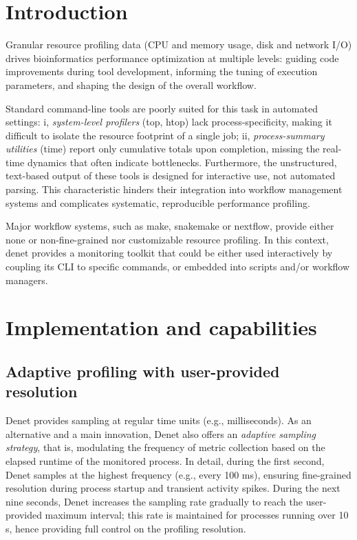 \documentclass[10pt]{article}
\renewcommand{\label}[1]{\gdef\labelname{##1}}%
\begin{document}
\section*{Introduction}  %
\label{sec:intro}

Granular resource profiling data (CPU and memory usage, disk and network I/O)  drives bioinformatics performance optimization at multiple levels: guiding code improvements during tool development, informing the tuning of execution parameters, and shaping the design of the overall workflow.

Standard command-line tools are poorly suited for this task in automated settings: i, \emph{system-level profilers} (top, htop) lack process-specificity, making it difficult to isolate the resource footprint of a single job; ii, \emph{process-summary utilities} (time) report only cumulative totals upon completion, missing the real-time dynamics that often indicate bottlenecks. Furthermore, the unstructured, text-based output of these tools is designed for interactive use, not automated parsing. This characteristic hinders their integration into workflow management systems and complicates systematic, reproducible performance profiling.

Major workflow systems, such as make, snakemake or nextflow, provide either none or non-fine-grained nor customizable resource profiling. In this context, denet provides a monitoring toolkit that could be either used interactively by coupling its CLI to specific commands, or embedded into scripts and/or workflow managers.

\section*{Implementation and capabilities}

\subsection*{Adaptive profiling with user-provided resolution}

Denet provides sampling at regular time units (e.g., milliseconds). As an alternative and a main innovation, Denet also offers an \emph{adaptive sampling strategy}, that is, modulating the frequency of metric collection based on the elapsed runtime of the monitored process. In detail, during the first second, Denet samples at the highest frequency (e.g., every 100 ms), ensuring fine-grained resolution during process startup and transient activity spikes. During the next nine seconds, Denet  increases the sampling rate gradually to reach the user-provided maximum interval; this rate is maintained for processes running over 10 s, hence providing full control on the profiling resolution.
\end{document}
